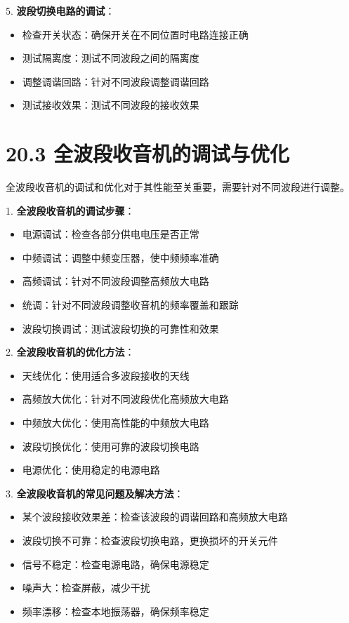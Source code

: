 \documentclass[12pt,UTF8]{ctexbook}
\begin{document}
5. \textbf{波段切换电路的调试}：
   \begin{itemize}[leftmargin=3.5em]
   \item 检查开关状态：确保开关在不同位置时电路连接正确
   \item 测试隔离度：测试不同波段之间的隔离度
   \item 调整调谐回路：针对不同波段调整调谐回路
   \item 测试接收效果：测试不同波段的接收效果
   \end{itemize}

\section*{20.3 全波段收音机的调试与优化}

全波段收音机的调试和优化对于其性能至关重要，需要针对不同波段进行调整。

1. \textbf{全波段收音机的调试步骤}：
   \begin{itemize}[leftmargin=3.5em]
   \item 电源调试：检查各部分供电电压是否正常
   \item 中频调试：调整中频变压器，使中频频率准确
   \item 高频调试：针对不同波段调整高频放大电路
   \item 统调：针对不同波段调整收音机的频率覆盖和跟踪
   \item 波段切换调试：测试波段切换的可靠性和效果
   \end{itemize}

2. \textbf{全波段收音机的优化方法}：
   \begin{itemize}[leftmargin=3.5em]
   \item 天线优化：使用适合多波段接收的天线
   \item 高频放大优化：针对不同波段优化高频放大电路
   \item 中频放大优化：使用高性能的中频放大电路
   \item 波段切换优化：使用可靠的波段切换电路
   \item 电源优化：使用稳定的电源电路
   \end{itemize}

3. \textbf{全波段收音机的常见问题及解决方法}：
   \begin{itemize}[leftmargin=3.5em]
   \item 某个波段接收效果差：检查该波段的调谐回路和高频放大电路
   \item 波段切换不可靠：检查波段切换电路，更换损坏的开关元件
   \item 信号不稳定：检查电源电路，确保电源稳定
   \item 噪声大：检查屏蔽，减少干扰
   \item 频率漂移：检查本地振荡器，确保频率稳定
   \end{itemize}
\end{document}
